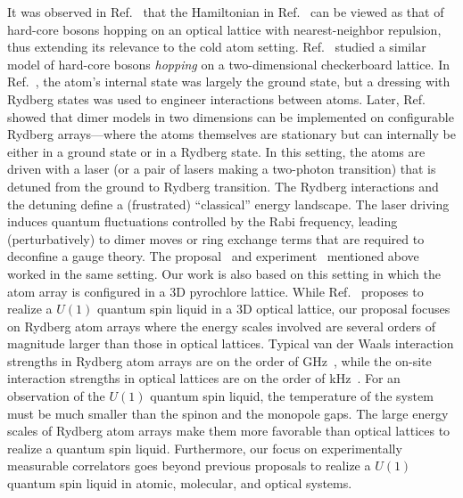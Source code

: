 \documentclass[twocolumn,superscriptaddress,amsmath,amssymb,aps,prx,nofootinbib]{revtex4-2}
\begin{document}
It was observed in Ref.~\cite{tewari2006emergence} that the Hamiltonian in Ref.~\cite{hermele2004} can be viewed as that of hard-core bosons hopping on an optical lattice with nearest-neighbor repulsion, thus extending its relevance to the cold atom setting. Ref.~\cite{glaetzle2014quantum} studied a similar model of hard-core bosons \textit{hopping} on a two-dimensional checkerboard lattice. In Ref.~\cite{glaetzle2014quantum}, the atom's internal state was largely the ground state, but a dressing with Rydberg states was used to engineer interactions between atoms. Later, Ref.~\cite{celi2020emerging} showed that dimer models in two dimensions can be implemented on configurable Rydberg arrays---where the atoms themselves are stationary but can internally be either in a ground state or in a Rydberg state. In this setting, the atoms are driven with a laser (or a pair of lasers making a two-photon transition) that is detuned from the ground to Rydberg transition. The Rydberg interactions and the detuning define a (frustrated) ``classical'' energy landscape. The laser driving induces quantum fluctuations controlled by the Rabi frequency, leading (perturbatively) to dimer moves or ring exchange terms that are required to deconfine a gauge theory. The proposal~\cite{verresen2021} and experiment~\cite{semeghini2021} mentioned above worked in the same setting. Our work is also based on this setting in which the atom array is configured in a 3D pyrochlore lattice.
While Ref.~\cite{tewari2006emergence} proposes to realize a $U(1)$ quantum spin liquid in a 3D optical lattice, our proposal focuses on Rydberg atom arrays where the energy scales involved are several orders of magnitude larger than those in optical lattices. 
Typical van der Waals interaction strengths in Rydberg atom arrays are on the order of GHz~\cite{semeghini2021}, while the on-site interaction strengths in optical lattices are on the order of kHz~\cite{adler2024observation,wienand2024emergence,thomas2017meanfield}.
For an observation of the $U(1)$ quantum spin liquid, the temperature of the system must be much smaller than the spinon and the monopole gaps. 
The large energy scales of Rydberg atom arrays make them  more favorable than optical lattices to realize a quantum spin liquid.
Furthermore, our focus on experimentally measurable correlators goes beyond previous proposals to realize a $U(1)$ quantum spin liquid in atomic, molecular, and optical systems.
\end{document}
